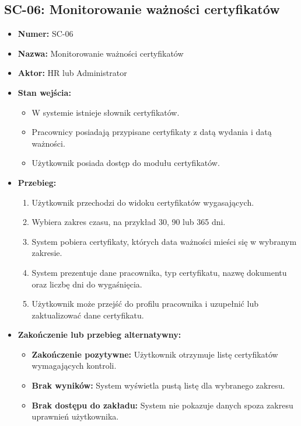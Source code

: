 \subsection{SC-06: Monitorowanie ważności certyfikatów}
\begin{itemize}
    \item \textbf{Numer:} SC-06
    \item \textbf{Nazwa:} Monitorowanie ważności certyfikatów
    \item \textbf{Aktor:} HR lub Administrator
    \item \textbf{Stan wejścia:}
    \begin{itemize}
        \item W systemie istnieje słownik certyfikatów.
        \item Pracownicy posiadają przypisane certyfikaty z datą wydania i datą ważności.
        \item Użytkownik posiada dostęp do modułu certyfikatów.
    \end{itemize}
    \item \textbf{Przebieg:}
    \begin{enumerate}
        \item Użytkownik przechodzi do widoku certyfikatów wygasających.
        \item Wybiera zakres czasu, na przykład 30, 90 lub 365 dni.
        \item System pobiera certyfikaty, których data ważności mieści się w wybranym zakresie.
        \item System prezentuje dane pracownika, typ certyfikatu, nazwę dokumentu oraz liczbę dni do wygaśnięcia.
        \item Użytkownik może przejść do profilu pracownika i uzupełnić lub zaktualizować dane certyfikatu.
    \end{enumerate}
    \item \textbf{Zakończenie lub przebieg alternatywny:}
    \begin{itemize}
        \item \textbf{Zakończenie pozytywne:} Użytkownik otrzymuje listę certyfikatów wymagających kontroli.
        \item \textbf{Brak wyników:} System wyświetla pustą listę dla wybranego zakresu.
        \item \textbf{Brak dostępu do zakładu:} System nie pokazuje danych spoza zakresu uprawnień użytkownika.
    \end{itemize}
\end{itemize}

